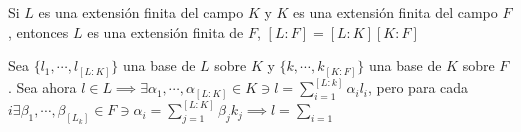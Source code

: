 \begin{teorema}[5A]
    Si $L$ es una extensión finita del campo $K$ y $K$ es una extensión finita del campo $F$, entonces $L$ es una extensión finita de $F$, $[L:F]=[L:K][K:F]$
    \begin{dem}
        Sea $\{l_1,\cdots,l_{[L:K]}\}$ una base de $L$ sobre $K$ y $\{k,\cdots,k_{[K:F]}\}$ una base de $K$ sobre $F$. Sea ahora $l\in L\implies \exists \alpha_1,\cdots, \alpha_{[L:K]}\in K \ni l = \sum_{i=1}^{[L:k]}\alpha_il_i$, pero para cada $i\exists \beta_1,\cdots, \beta_{[L_k]}\in F\ni \alpha_i=\sum_{j=1}^{[L:K]}\beta_jk_j\implies l=\sum_{i=1}^{}$
    \end{dem}
\end{teorema}

